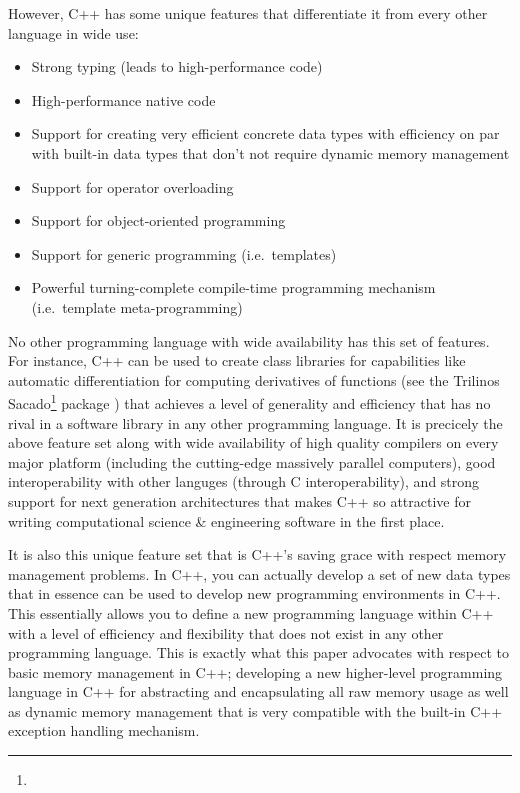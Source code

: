 \documentclass[pdf,ps2pdf,11pt]{SANDreport}
\begin{document}
However, C++ has some unique features that differentiate it from every
other language in wide use:

\begin{itemize}

{}\item Strong typing (leads to high-performance code)

{}\item High-performance native code

{}\item Support for creating very efficient concrete data types with
efficiency on par with built-in data types that don't not require
dynamic memory management

{}\item Support for operator overloading

{}\item Support for object-oriented programming

{}\item Support for generic programming (i.e.\ templates)

{}\item Powerful turning-complete compile-time programming mechanism
(i.e.\ template meta-programming)

\end{itemize}

No other programming language with wide availability has this set of
features.  For instance, C++ can be used to create class libraries for
capabilities like automatic differentiation {}\cite{ref:ad} for
computing derivatives of functions (see the Trilinos
Sacado\footnote{}
package {}\cite{phippsEtAl2006}) that achieves a level of generality
and efficiency that has no rival in a software library in any other
programming language.  It is precicely the above feature set along
with wide availability of high quality compilers on every major
platform (including the cutting-edge massively parallel computers),
good interoperability with other languges (through C
interoperability), and strong support for next generation
architectures {}\cite{DesignIssuesForMultiCore08} that makes C++ so
attractive for writing computational science \& engineering software
in the first place.

It is also this unique feature set that is C++'s saving grace with
respect memory management problems.  In C++, you can actually develop
a set of new data types that in essence can be used to develop new
programming environments in C++.  This essentially allows you to
define a new programming language within C++ with a level of
efficiency and flexibility that does not exist in any other
programming language.  This is exactly what this paper advocates with
respect to basic memory management in C++; developing a new
higher-level programming language in C++ for abstracting and
encapsulating all raw memory usage as well as dynamic memory
management that is very compatible with the built-in C++ exception
handling mechanism.
\end{document}

